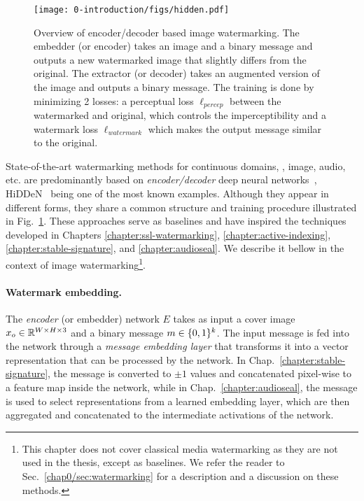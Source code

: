 \begin{figure}[b!]
    \centering
    \texttt{[image: 0-introduction/figs/hidden.pdf]}
    \caption{
        Overview of encoder/decoder based image watermarking. 
        The embedder (or encoder) takes an image and a binary message and outputs a new watermarked image that slightly differs from the original.
        The extractor (or decoder) takes an augmented version of the image and outputs a binary message.
        The training is done by minimizing 2 losses: a perceptual loss $\ell_{percep}$ between the watermarked and original, which controls the imperceptibility and a watermark loss $\ell_{watermark}$ which makes the output message similar to the original.
    }
    \label{chap0/fig:hidden}
\end{figure}

State-of-the-art watermarking methods for continuous domains, \eg, image, audio, etc. are predominantly based on \emph{encoder/decoder} deep neural networks~\citep{ahmadi2020redmark, DEAR_Liu0FMZY23, chen2023wavmark}, \Gls*{HiDDeN}~\citep{zhu2018hidden} being one of the most known examples.
Although they appear in different forms, they share a common structure and training procedure illustrated in Fig.~\ref{chap0/fig:hidden}.
These approaches serve as baselines and have inspired the techniques developed in Chapters \ref{chapter:ssl-watermarking}, \ref{chapter:active-indexing}, \ref{chapter:stable-signature}, and \ref{chapter:audioseal}.
We describe it bellow in the context of image watermarking\footnote{
    This chapter does not cover classical media watermarking as they are not used in the thesis, except as baselines.
    We refer the reader to Sec.~\ref{chap0/sec:watermarking} for a description and a discussion on these methods.
}.

\paragraph*{Watermark embedding.}
The \emph{encoder} (or embedder) network $E$ takes as input a cover image $x_o \in \mathbb{R}^{W\times H\times 3}$ and a binary message $m\in\{0,1\}^k$.
The input message is fed into the network through a \emph{message embedding layer} that transforms it into a vector representation that can be processed by the network.
In Chap.~\ref{chapter:stable-signature}, the message is converted to $\pm 1$ values and concatenated pixel-wise to a feature map inside the network, while in Chap.~\ref{chapter:audioseal}, the message is used to select representations from a learned embedding layer, which are then aggregated and concatenated to the intermediate activations of the network.

